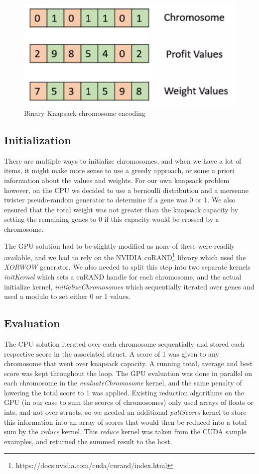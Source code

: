 \documentclass[11pt]{article}       %
\begin{document}
\begin{figure}[h]
    \centering
    \includegraphics[width=0.5\linewidth]{Figures/knapsack_representation.png}
    \caption{Binary Knapsack chromosome encoding}
    \label{fig:encoding}
\end{figure}

\subsection{Initialization}
There are multiple ways to initialize chromosomes, and when we have a lot of items, it might make more sense to use a greedy approach, or some a priori information about the values and weights. For our own knapsack problem however, on the CPU we decided to use a bernoulli distribution and a mersenne twister pseudo-random generator to determine if a gene was 0 or 1. We also ensured that the total weight was not greater than the knapsack capacity by setting the remaining genes to 0 if this capacity would be crossed by a chromosome.

The GPU solution had to be slightly modified as none of these were readily available, and we had to rely on the NVIDIA cuRAND\footnote[1]{https://docs.nvidia.com/cuda/curand/index.html} library which used the \textit{XORWOW} generator. We also needed to split this step into two separate kernels \textit{initKernel} which sets a cuRAND handle for each chromosome, and the actual initialize kernel, \textit{initializeChromosomes} which sequentially iterated over genes and used a modulo to set either 0 or 1 values.

\subsection{Evaluation}
The CPU solution iterated over each chromosome sequentially and stored each respective score in the associated struct. A score of 1 was given to any chromosome that went over knapsack capacity. A running total, average and best score was kept throughout the loop.
The GPU evaluation was done in parallel on each chromosome in the  \textit{evaluateChromosome} kernel, and the same penalty of lowering the total score to 1 was applied. Existing reduction algorithms on the GPU (in our case to sum the scores of chromosomes) only used arrays of floats or ints, and not over structs, so we needed an additional \textit{pullScores} kernel to store this information into an array of scores that would then be reduced into a total sum by the \textit{reduce} kernel. This \textit{reduce} kernel was taken from the CUDA sample examples, and returned the summed result to the host.
\end{document}

